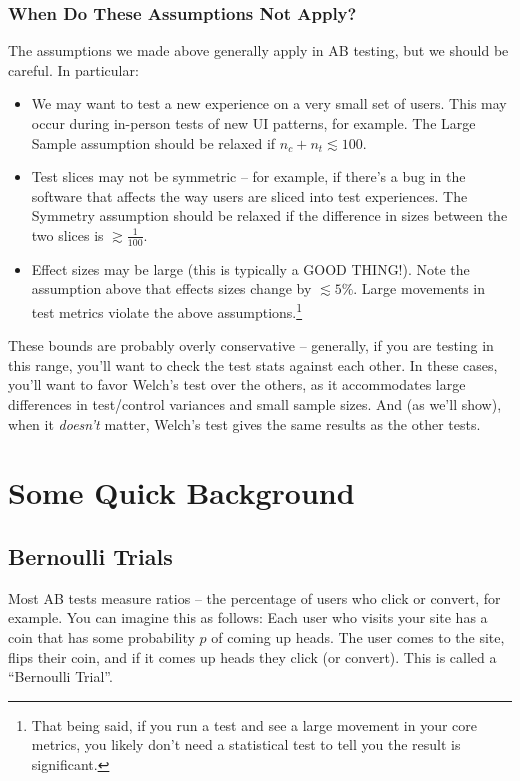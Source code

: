 \documentclass{article}
\numberwithin{equation}{section}
\begin{document}
\subsubsection{When Do These Assumptions Not Apply?}

The assumptions we made above generally apply in AB testing, but we should be careful. In particular:
\begin{itemize}
	\item We may want to test a new experience on a very small set of users. This may occur during in-person tests of new UI patterns, for example. The Large Sample assumption should be relaxed if $n_c + n_t \lesssim 100$.
	\item Test slices may not be symmetric -- for example, if there's a bug in the software that affects the way users are sliced into test experiences. The Symmetry assumption should be relaxed if the difference in sizes between the two slices is $\gtrsim \frac{1}{100}$.
	\item Effect sizes may be large (this is typically a GOOD THING!). Note the assumption above that effects sizes change by $\lesssim 5\%$. Large movements in test metrics violate the above assumptions.\footnote{That being said, if you run a test and see a large movement in your core metrics, you likely don't need a statistical test to tell you the result is significant. }
\end{itemize}
These bounds are probably overly conservative -- generally, if you are testing in this range, you'll want to check the test stats against each other. In these cases, you'll want to favor Welch's test over the others, as it accommodates large differences in test/control variances and small sample sizes. And (as we'll show), when it \textit{doesn't} matter, Welch's test gives the same results as the other tests.

\section{Some Quick Background}

\subsection{Bernoulli Trials}
Most AB tests measure ratios -- the percentage of users who click or convert, for example. You can imagine this as follows: Each user who visits your site has a coin that has some probability $p$ of coming up heads. The user comes to the site, flips their coin, and if it comes up heads they click (or convert). This is called a ``Bernoulli Trial''.
\end{document}
